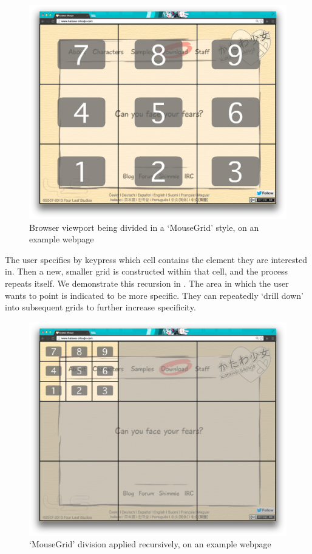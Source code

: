 \documentclass[11pt,openright,a4paper]{report}
\begin{document}
\begin{figure}[ht]
\centering\includegraphics[width=\textwidth]{figures/Grid9.png}
\caption{Browser viewport being divided in a `MouseGrid' style, on an example webpage}
\label{fig:grid9}
\end{figure}

\FloatBarrier

The user specifies by keypress which cell contains the element they are interested in. Then a new, smaller grid is constructed within that cell, and the process repeats itself. We demonstrate this recursion in . The area in which the user wants to point is indicated to be more specific. They can repeatedly `drill down' into subsequent grids to further increase specificity.

\begin{figure}[ht]
\centering\includegraphics[width=\textwidth]{figures/Grid9Drilled.png}
\caption{`MouseGrid' division applied recursively, on an example webpage}
\label{fig:grid9drilled}
\end{figure}
\end{document}
